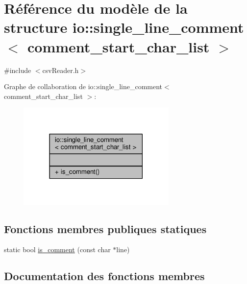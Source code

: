 \hypertarget{structio_1_1single__line__comment}{}\section{Référence du modèle de la structure io\+:\+:single\+\_\+line\+\_\+comment$<$ comment\+\_\+start\+\_\+char\+\_\+list $>$}
\label{structio_1_1single__line__comment}


{\ttfamily \#include $<$csv\+Reader.\+h$>$}



Graphe de collaboration de io\+:\+:single\+\_\+line\+\_\+comment$<$ comment\+\_\+start\+\_\+char\+\_\+list $>$\+:\nopagebreak
\begin{figure}[H]
\begin{center}
\leavevmode
\includegraphics[width=222pt]{structio_1_1single__line__comment__coll__graph}
\end{center}
\end{figure}
\subsection*{Fonctions membres publiques statiques}
\begin{DoxyCompactItemize}
\item 
static bool \hyperlink{structio_1_1single__line__comment_ac4b029bb0efd251505f8e610cc308a92}{is\+\_\+comment} (const char $\ast$line)
\end{DoxyCompactItemize}


\subsection{Documentation des fonctions membres}
\mbox{\label{structio_1_1single__line__comment_ac4b029bb0efd251505f8e610cc308a92}} 
